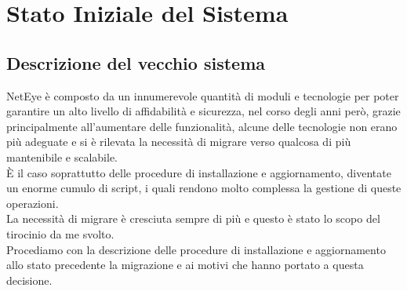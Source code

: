 \chapter{Stato Iniziale del Sistema}
\label{cha:stato_iniziale}

\section{Descrizione del vecchio sistema}
\label{sec:vecchio_sistema} NetEye è composto da un innumerevole quantità di
moduli e tecnologie per poter garantire un alto livello di affidabilità e
sicurezza, nel corso degli anni però, grazie principalmente all'aumentare delle
funzionalità, alcune delle tecnologie non erano più adeguate e si è rilevata la necessità
di migrare verso qualcosa di più mantenibile e scalabile.\\ È il caso soprattutto
delle procedure di installazione e aggiornamento, diventate un enorme cumulo di
script, i quali rendono molto complessa la gestione di queste operazioni.\\ La necessità
di migrare è cresciuta sempre di più e questo è stato lo scopo del tirocinio da me
svolto.\\ Procediamo con la descrizione delle procedure di installazione e aggiornamento
allo stato precedente la migrazione e ai motivi che hanno portato a questa decisione.

